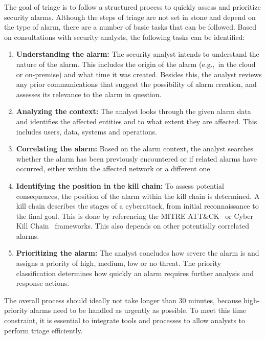 The goal of triage is to follow a structured process to quickly assess and prioritize security alarms.
Although the steps of triage are not set in stone and depend on the type of alarm, there are a number of basic tasks
that can be followed.
Based on consultations with security analysts, the following tasks can be identified:
\begin{enumerate}
    \item \textbf{Understanding the alarm:} The security analyst intends to understand the nature of the alarm.
    This includes the origin of the alarm (e.g.,\ in the cloud or on-premise) and what time it was created.
    Besides this, the analyst reviews any prior communications that suggest the possibility of alarm creation, and
    assesses its relevance to the alarm in question.

    \item \textbf{Analyzing the context:} The analyst looks through the given alarm data and identifies the affected
    entities and to what extent they are affected.
    This includes users, data, systems and operations.

    \item \textbf{Correlating the alarm:}
    Based on the alarm context, the analyst searches whether the alarm has been previously encountered or if related
    alarms have occurred, either within the affected network or a different one.

    \item \textbf{Identifying the position in the kill chain:}
    To assess potential consequences, the position of the alarm within the kill chain is determined.
    A kill chain describes the stages of a cyberattack, from initial reconnaissance to the final goal.
    This is done by referencing the MITRE ATT\&CK\ \citep{strom2018mitre} or Cyber Kill Chain\ \citep{lockheed2011ckc}
    frameworks.
    This also depends on other potentially correlated alarms.

    \item \textbf{Prioritizing the alarm:}
    The analyst concludes how severe the alarm is and assigns a priority of high, medium, low or no threat.
    The priority classification determines how quickly an alarm requires further analysis and response actions.
\end{enumerate}

The overall process should ideally not take longer than 30 minutes, because high-priority alarms need to be handled as
urgently as possible.
To meet this time constraint, it is essential to integrate tools and processes to allow analysts to perform triage
efficiently.

